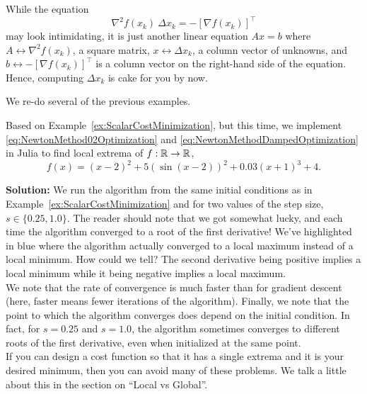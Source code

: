 \begin{tcolorbox}[title = {\bf Don't be Intimidated by the Notation!}]

    While the equation $$\nabla^2 f(x_k)~ \Delta x_{k} = - \left[\nabla f(x_k) \right]^\top
$$ may look intimidating, it is just another linear equation $Ax = b$ where $A \leftrightarrow \nabla^2 f(x_k)$, a square matrix, $x \leftrightarrow \Delta x_{k}$, a column vector of unknowns,  and $b \leftrightarrow  - \left[\nabla f(x_k) \right]^\top$ is a column vector on the right-hand side of the equation. Hence, computing $\Delta x_{k}$ is cake for you by now.
\end{tcolorbox}



We re-do several of the previous examples.

\begin{example}
\label{ex:ScalarCostMinimizationReDo}
Based on Example~\ref{ex:ScalarCostMinimization},  but this time, we implement \eqref{eq:NewtonMethod02Optimization} and \eqref{eq:NewtonMethodDampedOptimization} in Julia to find local extrema of $f:\mathbb R\to \mathbb R$,
$$f(x)=(x-2)^2 + 5 (\sin(x-2))^2 + 0.03(x+1)^3 + 4.$$

\end{example}

\textbf{Solution:} We run the algorithm from the same initial conditions as in Example~\ref{ex:ScalarCostMinimization} and for two values of the step size, $s \in \{0.25, 1.0 \}$. The reader should note that we got somewhat lucky, and each time the algorithm converged to a root of the first derivative! We've highlighted in blue where the algorithm actually converged to a local maximum instead of a local minimum. How could we tell? The second derivative being positive implies a local minimum while it being negative implies a local maximum.\\

We note that the rate of convergence is much faster than for gradient descent (here, faster means fewer iterations of the algorithm). Finally, we note that the point to which the algorithm converges does depend on the initial condition. In fact, for $s=0.25$ and $s=1.0$, the algorithm sometimes converges to different roots of the first derivative, even when initialized at the same point.\\

If you can design a cost function so that it has a single extrema and it is your desired minimum, then you can avoid many of these problems. We talk a little about this in the section on ``Local vs Global''. 

